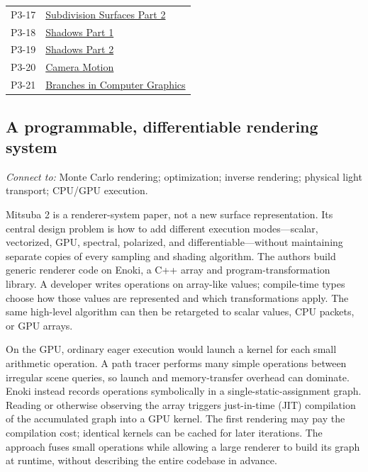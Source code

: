 {\begin{longtable}[]{@{}
  >{\raggedright\arraybackslash}p{}
  >{\raggedright\arraybackslash}p{}@{}}
P3-17 & \href{https://www.youtube.com/watch?v=THiF7-QxKXk}{Subdivision Surfaces Part 2} \\
P3-18 & \href{https://www.youtube.com/watch?v=kmdRmXuOjIY}{Shadows Part 1} \\
P3-19 & \href{https://www.youtube.com/watch?v=qiJhB0fOY6I}{Shadows Part 2} \\
P3-20 & \href{https://www.youtube.com/watch?v=HAJv25Afsz8}{Camera Motion} \\
P3-21 & \href{https://www.youtube.com/watch?v=NEIJW3ZJ1GE}{Branches in Computer Graphics} \\
\end{longtable}
}

\subsection{A programmable, differentiable rendering system}\label{03-visual-computing-i-ch011-a-programmable-differentiable-rendering-system}

\emph{Connect to:} Monte Carlo rendering; optimization; inverse rendering; physical light transport; CPU/GPU execution.

Mitsuba 2 is a renderer-system paper, not a new surface representation. Its central design problem is how to add different execution modes---scalar, vectorized, GPU, spectral, polarized, and differentiable---without maintaining separate copies of every sampling and shading algorithm. The authors build generic renderer code on Enoki, a C++ array and program-transformation library. A developer writes operations on array-like values; compile-time types choose how those values are represented and which transformations apply. The same high-level algorithm can then be retargeted to scalar values, CPU packets, or GPU arrays.

On the GPU, ordinary eager execution would launch a kernel for each small arithmetic operation. A path tracer performs many simple operations between irregular scene queries, so launch and memory-transfer overhead can dominate. Enoki instead records operations symbolically in a single-static-assignment graph. Reading or otherwise observing the array triggers just-in-time (JIT) compilation of the accumulated graph into a GPU kernel. The first rendering may pay the compilation cost; identical kernels can be cached for later iterations. The approach fuses small operations while allowing a large renderer to build its graph at runtime, without describing the entire codebase in advance.

